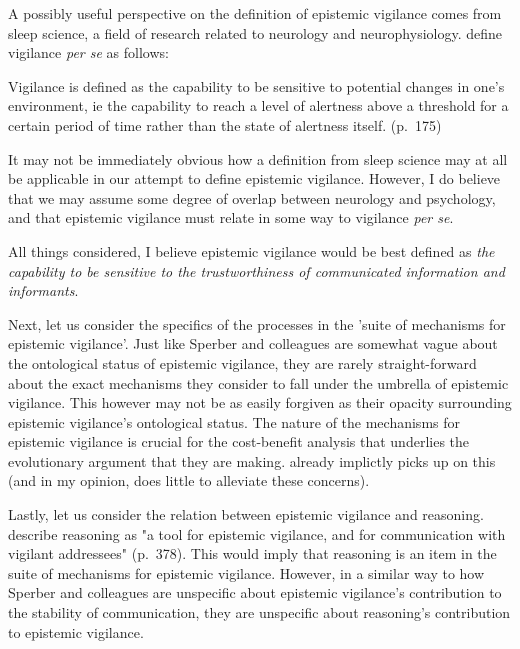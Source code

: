A possibly useful perspective on the definition of epistemic vigilance comes from sleep science, a field of research related to neurology and neurophysiology. \citet{VanSchie21} define vigilance \emph{per se} as follows:
\begin{quoting}
    Vigilance is defined as the capability to be sensitive to potential changes in one's environment, ie the capability to reach a level of alertness above a threshold for a certain period of time rather than the state of alertness itself.
    \hfill (p.~175)
\end{quoting}
It may not be immediately obvious how a definition from sleep science may at all be applicable in our attempt to define epistemic vigilance. However, I do believe that we may assume some degree of overlap between neurology and psychology, and that epistemic vigilance must relate in some way to vigilance \emph{per se}.

All things considered, I believe epistemic vigilance would be best defined as \emph{the capability to be sensitive to the trustworthiness of communicated information and informants}.

Next, let us consider the specifics of the processes in the 'suite of mechanisms for epistemic vigilance'. Just like Sperber and colleagues are somewhat vague about the ontological status of epistemic vigilance, they are rarely straight-forward about the exact mechanisms they consider to fall under the umbrella of epistemic vigilance. This however may not be as easily forgiven as their opacity surrounding epistemic vigilance's ontological status. The nature of the mechanisms for epistemic vigilance is crucial for the cost-benefit analysis that underlies the evolutionary argument that they are making. \citet{Michaelian13} already implictly picks up on this (and in my opinion, \citet{Sperber13} does little to alleviate these concerns).

Lastly, let us consider the relation between epistemic vigilance and reasoning. \citet{Sperber10} describe reasoning as "a tool for epistemic vigilance, and for communication with vigilant addressees" (p.~378). This would imply that reasoning is an item in the suite of mechanisms for epistemic vigilance. However, in a similar way to how Sperber and colleagues are unspecific about epistemic vigilance's contribution to the stability of communication, they are unspecific about reasoning's contribution to epistemic vigilance.

